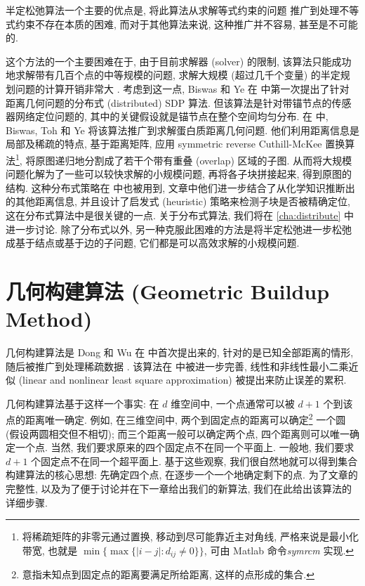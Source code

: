 \documentclass{CASthesis_zzk}
\begin{document}
半定松弛算法一个主要的优点是, 将此算法从求解等式约束的问题
推广到处理不等式约束不存在本质的困难, 
而对于其他算法来说, 这种推广并不容易, 甚至是不可能的.

这个方法的一个主要困难在于, 由于目前求解器 (solver) 的限制,
该算法只能成功地求解带有几百个点的中等规模的问题,
求解大规模 (超过几千个变量) 的半定规划问题的计算开销非常大 \cite{Fang2013}.
考虑到这一点, Biswas 和 Ye 在 \cite{Biswas2006-2} 中第一次提出了针对
距离几何问题的分布式 (distributed) SDP 算法.
但该算法是针对带锚节点的传感器网络定位问题的,
其中的关键假设就是锚节点在整个空间均匀分布.
在 \cite{Biswas2008} 中, Biswas, Toh 和 Ye 将该算法推广到求解蛋白质距离几何问题.
他们利用距离信息是局部及稀疏的特点, 基于距离矩阵,
应用 symmetric reverse Cuthill-McKee 置换算法\footnote{将稀疏矩阵的非零元通过置换, 移动到尽可能靠近主对角线\cite{george1981computer}, 严格来说是最小化带宽, 也就是 $\min \{\max \{|i-j|: d_{ij}\neq 0\}\}$, 可由 Matlab 命令\emph{symrcm} 实现.}, 
将原图递归地分割成了若干个带有重叠 (overlap) 区域的子图.
从而将大规模问题化解为了一些可以较快求解的小规模问题,
再将各子块拼接起来, 得到原图的结构. 
这种分布式策略在 \cite{Fang2013} 中也被用到, 
文章中他们进一步结合了从化学知识推断出的其他距离信息, 
并且设计了启发式 (heuristic) 策略来检测子块是否被精确定位,
这在分布式算法中是很关键的一点.
关于分布式算法, 我们将在 \ref{cha:distribute} 中进一步讨论.
除了分布式以外, 另一种克服此困难的方法是将半定松弛进一步松弛 \cite{Wang2008} 
成基于结点或基于边的子问题, 它们都是可以高效求解的小规模问题.




\section{几何构建算法 (Geometric Buildup Method)}
\label{sec:GB}

几何构建算法是 Dong 和 Wu 在 \cite{Dong2002} 中首次提出来的, 
针对的是已知全部距离的情形, 
随后被推广到处理稀疏数据 \cite{Wu2006}. 
该算法在 \cite{Wu2008,Sit2009} 中被进一步完善, 
线性和非线性最小二乘近似 (linear and nonlinear least square approximation)
被提出来防止误差的累积.

几何构建算法基于这样一个事实: 在 $d$ 维空间中,
一个点通常可以被 $d+1$ 个到该点的距离唯一确定.
例如, 在三维空间中, 两个到固定点的距离可以确定\footnote{意指未知点到固定点的距离要满足所给距离, 这样的点形成的集合.}
一个圆 (假设两圆相交但不相切); 
而三个距离一般可以确定两个点, 四个距离则可以唯一确定一个点.
当然, 我们要求原来的四个固定点不在同一个平面上.
一般地, 我们要求 $d+1$ 个固定点不在同一个超平面上.
基于这些观察, 我们很自然地就可以得到集合构建算法的核心思想:
先确定四个点, 在逐步一个一个地确定剩下的点.
为了文章的完整性, 以及为了便于讨论并在下一章给出我们的新算法,
我们在此给出该算法的详细步骤.
\end{document}
